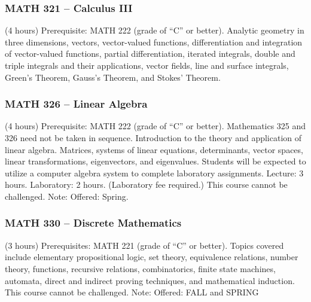 \subsubsection{MATH 321 -- Calculus III}
(4 hours) Prerequisite: MATH 222 (grade of “C” or better). Analytic geometry in three dimensions, vectors, vector-valued functions, differentiation and integration of vector-valued functions, partial differentiation, iterated integrals, double and triple integrals and their applications, vector fields, line and surface integrals, Green’s Theorem, Gauss’s Theorem, and Stokes’ Theorem.

\subsubsection{MATH 326 -- Linear Algebra}
(4 hours) Prerequisite: MATH 222 (grade of “C” or better). Mathematics 325 and 326 need not be taken in sequence. Introduction to the theory and application of linear algebra. Matrices, systems of linear equations, determinants, vector spaces, linear transformations, eigenvectors, and eigenvalues. Students will be expected to utilize a computer algebra system to complete laboratory assignments. Lecture: 3 hours. Laboratory: 2 hours. (Laboratory fee required.) This course cannot be challenged. Note: Offered: Spring.

\subsubsection{MATH 330 -- Discrete Mathematics}
(3 hours) Prerequisites: MATH 221 (grade of “C” or better). Topics covered include elementary propositional logic, set theory, equivalence relations, number theory, functions, recursive relations, combinatorics, finite state machines, automata, direct and indirect proving techniques, and mathematical induction. This course cannot be challenged. Note: Offered: FALL and SPRING